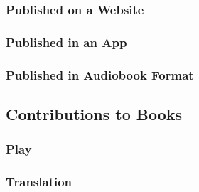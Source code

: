 \documentclass{ltxdockit}
\begin{document}
\subsubsection{Published on a Website} %
\label{sub:published_on_a_website}
\begin{refsection}
	\printbibliography[heading=none]
\end{refsection}
\subsubsection{Published in an App} %
\label{sub:published_in_an_app_book}
\begin{refsection}
	\printbibliography[heading=none]
\end{refsection}
\subsubsection{Published in Audiobook Format} %
\label{sub:published_in_audiobook_format}
\begin{refsection}
	\printbibliography[heading=none]
\end{refsection}

\subsection{Contributions to Books} %
\label{sec:contributions_to_books}
\subsubsection{Play} %
\label{sub:play}
\begin{refsection}
	\printbibliography[heading=none]
\end{refsection}
\subsubsection{Translation} %
\label{sub:translation}
\begin{refsection}
	\printbibliography[heading=none]
\end{refsection}
\end{document}
